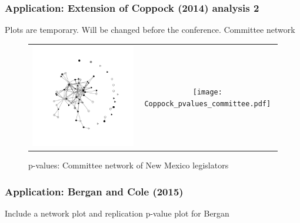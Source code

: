 \documentclass{beamer}
\begin{document}
\begin{frame}
\frametitle{Application: Extension of Coppock (2014) analysis 2}
Plots are temporary. Will be changed before the conference. Committee network
	\begin{figure}
	\centering
	\begin{tabular}{cc}
	\includegraphics[scale=0.3]{Coppock_nm_committee_net.pdf} &
	\texttt{[image: Coppock\_pvalues\_committee.pdf]} \\ 
	\end{tabular}
	\caption{p-values: Committee network of New Mexico legislators}
	\end{figure}
\end{frame}


\begin{frame}
\frametitle{Application: Bergan and Cole (2015)}
Include a network plot and replication p-value plot for Bergan
\end{frame}
\end{document}
